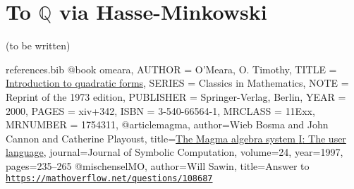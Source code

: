 \documentclass[10pt,a4paper]{amsart}
\numberwithin{equation}{section}
\numberwithin{figure}{section}
\theoremstyle{definition}
\theoremstyle{remark}
\theoremstyle{plain}
\theoremstyle{plain}
\theoremstyle{definition}
\theoremstyle{plain}
\theoremstyle{plain}
\begin{document}
    \section{To $\mathbb{Q}$ via Hasse-Minkowski} (to be written)

\begin{filecontents}{references.bib}
@book {omeara,
    AUTHOR = {O'Meara, O. Timothy},
     TITLE = {\href{https://link.springer.com/book/10.1007\%2F978-3-642-62031-7}{Introduction to quadratic forms}},
    SERIES = {Classics in Mathematics},
      NOTE = {Reprint of the 1973 edition},
 PUBLISHER = {Springer-Verlag, Berlin},
      YEAR = {2000},
     PAGES = {xiv+342},
      ISBN = {3-540-66564-1},
   MRCLASS = {11Exx},
  MRNUMBER = {1754311},
}
@article{magma,
author={Wieb Bosma and John Cannon and Catherine Playoust},
title={\href{http://www.sciencedirect.com/science/article/pii/S074771719690125X}{The Magma algebra system {I}: The user language}},
journal={Journal of Symbolic Computation},
volume={24},
year={1997},
pages={235--265}
}
@misc{henselMO,
	author={Will Sawin},
	title={Answer to \href{https://mathoverflow.net/questions/108687}{\texttt{https://mathoverflow.net/questions/108687}}}
}
\end{filecontents}



\end{document}
